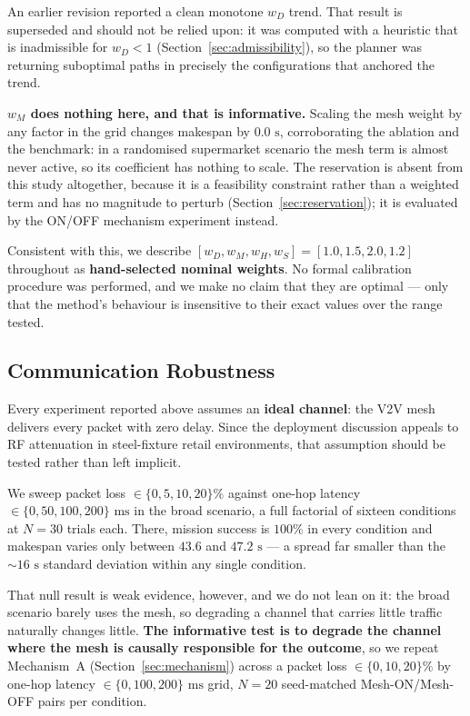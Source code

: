 \documentclass[journal]{IEEEtran}
\begin{document}
An earlier revision reported a clean monotone $w_D$ trend. That result is superseded
and should not be relied upon: it was computed with a heuristic that is inadmissible
for $w_D < 1$ (Section~\ref{sec:admissibility}), so the planner was returning
suboptimal paths in precisely the configurations that anchored the trend.

\textbf{$w_M$ does nothing here, and that is informative.} Scaling the mesh weight by
any factor in the grid changes makespan by $0.0\text{ s}$, corroborating the ablation
and the benchmark: in a randomised supermarket scenario the mesh term is almost never
active, so its coefficient has nothing to scale. The reservation is absent from this
study altogether, because it is a feasibility constraint rather than a weighted term
and has no magnitude to perturb (Section~\ref{sec:reservation}); it is evaluated by
the ON/OFF mechanism experiment instead.

Consistent with this, we describe $[w_D, w_M, w_H, w_S] = [1.0, 1.5, 2.0, 1.2]$
throughout as \textbf{hand-selected nominal weights}. No formal calibration procedure
was performed, and we make no claim that they are optimal --- only that the method's
behaviour is insensitive to their exact values over the range tested.

\subsection{Communication Robustness}
\label{sec:comm}
Every experiment reported above assumes an \textbf{ideal channel}: the V2V mesh
delivers every packet with zero delay. Since the deployment discussion appeals to RF
attenuation in steel-fixture retail environments, that assumption should be tested
rather than left implicit.

We sweep packet loss $\in \{0, 5, 10, 20\}\%$ against one-hop latency $\in \{0, 50,
100, 200\}\text{ ms}$ in the broad scenario, a full factorial of sixteen conditions at
$N=30$ trials each. There, mission success is $100\%$ in every condition and makespan
varies only between $43.6$ and $47.2\text{ s}$ --- a spread far smaller than the
${\sim}16\text{ s}$ standard deviation within any single condition.

That null result is weak evidence, however, and we do not lean on it: the broad
scenario barely uses the mesh, so degrading a channel that carries little traffic
naturally changes little. \textbf{The informative test is to degrade the channel
where the mesh is causally responsible for the outcome}, so we repeat Mechanism~A
(Section~\ref{sec:mechanism}) across a packet loss $\in \{0, 10, 20\}\%$ by one-hop
latency $\in \{0, 100, 200\}\text{ ms}$ grid, $N=20$ seed-matched Mesh-ON/Mesh-OFF
pairs per condition.
\end{document}
